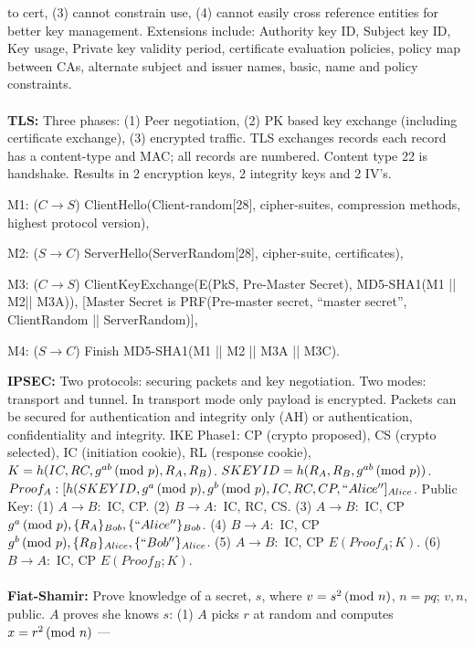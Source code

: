 to cert, (3) cannot constrain use, (4) cannot easily cross reference entities for better
key management.  Extensions include: Authority key ID, Subject key  ID, Key usage, Private
key validity period, certificate evaluation policies, policy map between CAs, 
alternate subject and issuer names, basic, name and policy constraints.
\\
\\
{\bf TLS:} Three phases: (1) Peer negotiation, (2) PK based key exchange 
(including certificate exchange), (3) encrypted traffic.  TLS exchanges records 
each record has a content-type and MAC; all records are numbered.
Content type 22 is handshake.  Results in 2 encryption keys, 2 integrity keys and 2 IV's.
\begin{description}
\item M1: ($C \rightarrow S$) ClientHello(Client-random[28], cipher-suites, compression methods, highest protocol version),
\item M2: ($S \rightarrow C)$ ServerHello(ServerRandom[28], cipher-suite, certificates),
\item M3: ($C \rightarrow S$) ClientKeyExchange(E(PkS, Pre-Master Secret), 
MD5-SHA1(M1 || M2|| M3A)), [Master Secret is PRF(Pre-master secret, ``master secret'', 
ClientRandom || ServerRandom)],
\item M4: ($S \rightarrow C$) Finish MD5-SHA1(M1 || M2 || M3A || M3C).
\end{description}
{\bf IPSEC:} Two protocols: securing packets and key negotiation.  Two modes: 
transport and tunnel.  In transport mode only payload is encrypted.  Packets can be 
secured for authentication and integrity only (AH) or authentication, confidentiality and
integrity.  IKE Phase1: CP (crypto proposed), CS (crypto selected), 
IC (initiation cookie),
RL (response cookie), $K= h(IC,RC,g^{ab} \thinspace \textnormal{(mod } p \textnormal{)}, R_A, R_B)$.  
$SKEYID= h(R_A, R_B, g^{ab} \thinspace \textnormal{(mod } p \textnormal{)})$.  $Proof_A: 
[h(SKEYID, g^a \thinspace \textnormal{(mod } p \textnormal{)}, g^b \thinspace \textnormal{(mod } p \textnormal{)}, IC, RC, CP, ``Alice'']_{Alice}$. Public Key:
(1) $A \rightarrow B:$ IC, CP.
(2) $B \rightarrow A:$ IC, RC, CS.
(3) $A \rightarrow B:$ IC, CP $g^a \thinspace \textnormal{(mod } p \textnormal{)}, \{R_A\}_{Bob}, \{``Alice''\}_{Bob}$.
(4) $B \rightarrow A:$ IC, CP $g^b \thinspace \textnormal{(mod } p \textnormal{)}, \{R_B\}_{Alice}, \{``Bob''\}_{Alice}$.
(5) $A \rightarrow B:$ IC, CP $E(Proof_A;K)$.
(6) $B \rightarrow A:$ IC, CP $E(Proof_B;K)$.
\\
\\
{\bf Fiat-Shamir:}
Prove knowledge of a secret, $s$, where $v= s^2 \thinspace \textnormal{(mod } n \textnormal{)}$, $n=pq$; $v, n$, public.
$A$ proves she knows $s$: (1) $A$ picks $r$ at random and computes $x=r^2 \thinspace \textnormal{(mod } n \textnormal{)}$ ---
